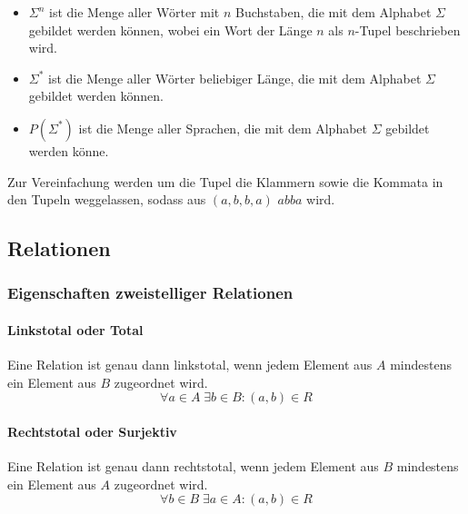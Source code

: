 \documentclass[../main.tex]{subfiles}
\begin{document}
                \begin{itemize}
                    \item $\Sigma^n$ ist die Menge aller Wörter mit $n$ Buchstaben, die mit dem Alphabet $\Sigma$ gebildet werden können, wobei ein Wort der Länge $n$ als $n$-Tupel beschrieben wird.
                    \item $\Sigma^*$ ist die Menge aller Wörter beliebiger Länge, die mit dem Alphabet $\Sigma$ gebildet werden können.
                    \item $P\left(\Sigma^*\right)$ ist die Menge aller Sprachen, die mit dem Alphabet $\Sigma$ gebildet werden könne.
                \end{itemize}

                Zur Vereinfachung werden um die Tupel die Klammern sowie die Kommata in den Tupeln weggelassen, sodass aus $\left(a, b, b, a\right)$ $abba$ wird.
                    
        \subsection{Relationen}
            \subsubsection{Eigenschaften zweistelliger Relationen}
            	\paragraph{Linkstotal oder Total}
                    Eine Relation ist genau dann linkstotal, wenn jedem Element aus $A$ mindestens ein Element aus $B$ zugeordnet wird.
                    \begin{equation}
                        \forall a \in A\; \exists b \in B\colon \left(a, b\right) \in R
                    \end{equation}
                    
                \paragraph{Rechtstotal oder Surjektiv}
                    Eine Relation ist genau dann rechtstotal, wenn jedem Element aus $B$ mindestens ein Element aus $A$ zugeordnet wird.
                    \begin{equation}
                        \forall b \in B\; \exists a \in A\colon \left(a, b\right) \in R
                    \end{equation}
                    
\end{document}
